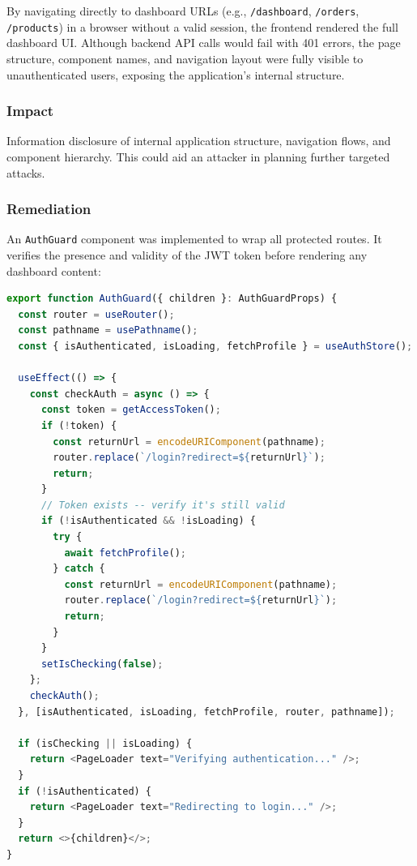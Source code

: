 \documentclass[12pt,a4paper]{article}
\begin{document}
By navigating directly to dashboard URLs (e.g., \texttt{/dashboard}, \texttt{/orders}, \texttt{/products}) in a browser without a valid session, the frontend rendered the full dashboard UI. Although backend API calls would fail with 401 errors, the page structure, component names, and navigation layout were fully visible to unauthenticated users, exposing the application's internal structure.

\subsubsection{Impact}

Information disclosure of internal application structure, navigation flows, and component hierarchy. This could aid an attacker in planning further targeted attacks.

\subsubsection{Remediation}

An \texttt{AuthGuard} component was implemented to wrap all protected routes. It verifies the presence and validity of the JWT token before rendering any dashboard content:

\begin{lstlisting}[language=TypeScript, caption={components/auth/auth-guard.tsx}]
export function AuthGuard({ children }: AuthGuardProps) {
  const router = useRouter();
  const pathname = usePathname();
  const { isAuthenticated, isLoading, fetchProfile } = useAuthStore();

  useEffect(() => {
    const checkAuth = async () => {
      const token = getAccessToken();
      if (!token) {
        const returnUrl = encodeURIComponent(pathname);
        router.replace(`/login?redirect=${returnUrl}`);
        return;
      }
      // Token exists -- verify it's still valid
      if (!isAuthenticated && !isLoading) {
        try {
          await fetchProfile();
        } catch {
          const returnUrl = encodeURIComponent(pathname);
          router.replace(`/login?redirect=${returnUrl}`);
          return;
        }
      }
      setIsChecking(false);
    };
    checkAuth();
  }, [isAuthenticated, isLoading, fetchProfile, router, pathname]);

  if (isChecking || isLoading) {
    return <PageLoader text="Verifying authentication..." />;
  }
  if (!isAuthenticated) {
    return <PageLoader text="Redirecting to login..." />;
  }
  return <>{children}</>;
}
\end{lstlisting}
\end{document}

